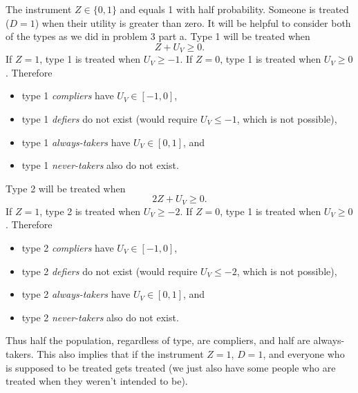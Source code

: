 \documentclass[12pt]{article}
\begin{document}
The instrument $Z \in \{0,1\}$ and equals 1 with half probability. Someone is treated ($D=1$) when their utility is greater than zero. It will be helpful to consider both of the types as we did in problem 3 part a. Type 1 will be treated when 
    \[ Z + U_V \geq 0. \]
If $Z = 1$, type 1 is treated when $U_V \geq - 1$. If $Z= 0$, type 1 is treated when $U_V \geq 0$. Therefore 
\begin{itemize}
    \item type 1 \emph{compliers} have $U_V \in [-1,0]$,
    \item type 1 \emph{defiers} do not exist (would require $U_V \le -1$, which is not possible),
    \item type 1 \emph{always-takers} have $U_V \in [0,1]$, and 
    \item type 1 \emph{never-takers} also do not exist. 
\end{itemize}
Type 2 will be treated when 
    \[ 2Z + U_V \geq 0 .\]
If $Z = 1$, type 2 is treated when $U_V \geq - 2$. If $Z= 0$, type 1 is treated when $U_V \geq 0$. Therefore 
\begin{itemize}
    \item type 2 \emph{compliers} have $U_V \in [-1,0]$,
    \item type 2 \emph{defiers} do not exist (would require $U_V \le -2$, which is not possible),
    \item type 2 \emph{always-takers} have $U_V \in [0,1]$, and 
    \item type 2 \emph{never-takers} also do not exist. 
\end{itemize}
Thus half the population, regardless of type, are compliers, and half are always-takers. This also implies that if the instrument $Z=1$, $D=1$, and everyone who is supposed to be treated gets treated (we just also have some people who are treated when they weren't intended to be). 
\end{document}
